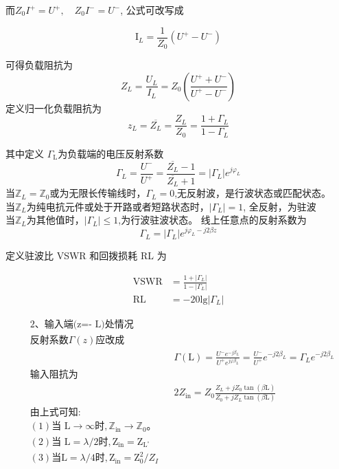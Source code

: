 \documentclass[12pt,hyperref,a4paper,UTF8]{ctexart}
\begin{document}
而$Z_0I^+=U^+,\quad Z_0I^-=U^-$, 公式可改写成

$$
\mathrm{I}_{L}=\frac{1}{Z_{0}}(U^{+}-U^{-})
$$

可得负载阻抗为
$$
Z_{L}=\frac{U_{L}}{I_{L}}=Z_{0}\left(\frac{U^{+}+U^{-}}{U^{+}-U^{-}}\right)
$$
定义归一化负载阻抗为
$$
z_{L}=\overline{Z_{L}}=\frac{Z_{L}}{Z_{0}}=\frac{1+\Gamma_{L}}{1-\Gamma_{L}}
$$

其中定义 $\Gamma_\mathrm{L}$为负载端的电压反射系数
$$
\Gamma_L=\frac{U^-}{U^+}=\frac{\overline{Z_L}-1}{\overline{Z_L}+1}=|\Gamma_L|e^{j\varphi_L}
$$
当$\mathbb{Z}_L=\mathbb{Z}_0$或为无限长传输线时，$\Gamma_L=0$,无反射波，是行波状态或匹配状态。\\
当$\mathbb{Z}_L$为纯电抗元件或处于开路或者短路状态时，$|\Gamma_L|=1$, 全反射，为驻波\\
当$\mathbb{Z}_L$为其他值时，$|\Gamma_L|\leq1$,为行波驻波状态。
线上任意点的反射系数为
$$
\Gamma_{L}=|\Gamma_{L}|e^{j\varphi_{L}-j2\beta z}
$$

定义驻波比 VSWR 和回拨损耗 RL 为

\begin{equation}\begin{aligned}\mathrm{VSWR}&=\frac{1+|\Gamma_L|}{1-|\Gamma_L|}\\\mathrm{RL}&=-20\mathrm{lg}|\Gamma_L|\end{aligned}\end{equation}


\begin{equation}
    \begin{aligned}
    &\text{2、输入端(z=- L)处情况} \\
    &反射系数 \Gamma(z)应改成 \\
    &&&\Gamma(\mathrm{L})=\frac{U^{-}e^{-j\beta_{L}}}{U^{+}e^{j\varphi\beta_{L}}}=\frac{U^{-}}{U^{+}}e^{-j2\beta_{L}}=\Gamma_{L}e^{-j2\beta_{L}} \\
    &\text{输入阻抗为} \\
    &&&\text{2} Z_{\mathrm{in}}=Z_{0}\frac{Z_{L}+jZ_{0}\tan(\beta\mathrm{L})}{Z_{0}+jZ_{L}\tan(\beta\mathrm{L})}  \\
    &\text{由上式可知:} \\
    &(1)\text{当 L}\to\infty\text{时},\mathbb{Z}_{\mathrm{in}}\to\mathbb{Z}_{0}。 \\
    &\mathrm{(2)}\text{当 L}=\lambda/2\text{时},\mathrm{Z_{in}=Z_{L^{\circ}}} \\
    &(3)当\mathrm{L}=\lambda/4\text{时},\mathrm{Z}_{\mathrm{in}}=\mathrm{Z}_{0}^{2}/Z_{I}
    \end{aligned}
\end{equation}
\end{document}
